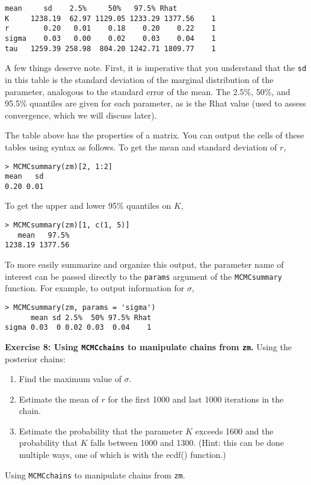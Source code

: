 \documentclass[12pt,english]{article}
\begin{document}
\begin{Verbatim}[fontsize=\small]
         mean     sd    2.5%     50%   97.5% Rhat
K     1238.19  62.97 1129.05 1233.29 1377.56    1
r        0.20   0.01    0.18    0.20    0.22    1
sigma    0.03   0.00    0.02    0.03    0.04    1
tau   1259.39 258.98  804.20 1242.71 1809.77    1
\end{Verbatim}

\noindent A few things deserve note. First, it is imperative that you understand that the \texttt{sd} in this table is the standard deviation of the marginal distribution of the parameter, analogous to the standard error of the mean. The 2.5\%, 50\%, and 95.5\% quantiles are given for each parameter, as is the Rhat value (used to assess convergence, which we will discuss later).

\noindent The table above has the properties of a matrix. You can output the cells of these tables using syntax as follows. To get the mean and standard deviation of $r$,

\begin{Verbatim}
> MCMCsummary(zm)[2, 1:2]
mean   sd 
0.20 0.01 
\end{Verbatim}

\noindent To get the upper and lower 95\% quantiles on $K$, 

\begin{Verbatim}
> MCMCsummary(zm)[1, c(1, 5)]
   mean   97.5% 
1238.19 1377.56
\end{Verbatim}

\noindent To more easily summarize and organize this output, the parameter name of interest can be passed directly to the \texttt{params} argument of the \texttt{MCMCsummary} function. For example, to output information for $\sigma$,

\begin{Verbatim}
> MCMCsummary(zm, params = 'sigma')
      mean sd 2.5%  50% 97.5% Rhat
sigma 0.03  0 0.02 0.03  0.04    1
\end{Verbatim}

\bigskip
\belowcaptionskip=-20pt
\begin{exercise}
\begin{mdframed}
\doublespacing
\textbf{Exercise 8: Using \texttt{MCMCchains} to manipulate chains from \texttt{zm}.} Using the posterior chains:
\begin{enumerate}
\item Find the maximum value of $\sigma$.
\item Estimate the mean of $r$ for the first 1000 and last 1000 iterations in the chain.
\item Estimate the probability that the parameter $K$ exceeds 1600 and the probability that $K$ falls between 1000 and 1300. (Hint: this can be done multiple ways, one of which is with the ecdf() function.)
\end{enumerate}
\end{mdframed}
\captionsetup{textformat=empty, labelformat=empty}
\caption[Using \texttt{MCMCchains} to manipulate chains from \texttt{zm}]{Using \texttt{MCMCchains} to manipulate chains from \texttt{zm}.}
\label{ex:MCMCchains}
\end{exercise}
\belowcaptionskip=0pt
\end{document}
